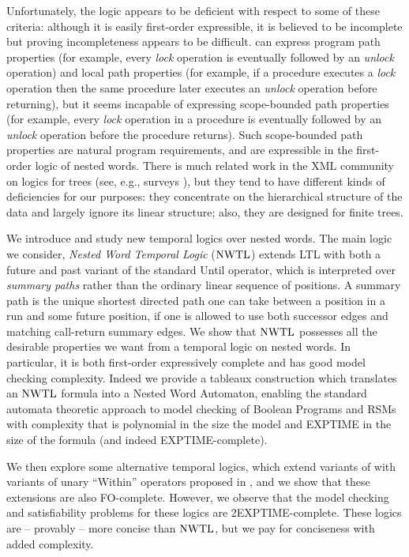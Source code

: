 \documentclass{LMCS}
\theoremstyle{plain}
\theoremstyle{definition}
\newcommand{\caret}{\text{CaRet}}
\newcounter{example}
\begin{document}
Unfortunately, the logic \caret{} appears to be deficient with respect
to some of these criteria: although it is easily first-order
expressible, it is believed to be incomplete but
proving incompleteness 
appears to be difficult.  
\caret{}  can express
program 
path properties (for example, every {\it lock\/} operation is
eventually followed by an {\em unlock\/} operation) and local path
properties (for example, if a procedure executes a {\em lock\/}
operation then the same procedure later executes an {\em unlock\/}
operation before returning), but it seems incapable of expressing
scope-bounded path properties (for example, every {\it lock\/}
operation in a procedure is eventually followed by an {\em unlock\/}
operation before the procedure returns).  Such scope-bounded path
properties are natural program requirements, and are expressible in
the first-order logic of nested words.  There is much related work in
the XML community on logics for trees (see, e.g., surveys
\cite{KSS03,Lib05,vianu-pods}), but they tend to have different kinds
of deficiencies for our purposes: they concentrate on the hierarchical
structure of the data and largely ignore its linear structure; also,
they are designed for finite trees.


We introduce and study new temporal logics over nested
words.  The main logic we consider, \emph{Nested Word Temporal Logic}
($\text{\rm NWTL}$) extends LTL with both a future and past variant of the
standard Until operator, which is interpreted over {\em summary paths}
rather than the ordinary linear sequence of positions.  A summary
path is the unique shortest directed path one can take
between a position in a run and some future position, if one is
allowed to use both successor edges and matching call-return
summary edges.  We show that $\text{\rm NWTL}$ possesses all the desirable
properties we want from a temporal logic on nested words.  In
particular, it is both first-order expressively complete and has good
model checking complexity.  Indeed we provide a tableaux construction
which translates an $\text{\rm NWTL}$ formula into a Nested Word Automaton,
enabling the standard automata theoretic approach to model checking of
Boolean Programs and RSMs with complexity that is polynomial in the
size the model and EXPTIME in the size of the formula (and indeed
EXPTIME-complete). 


We then explore some alternative temporal logics, which extend
variants of \caret{} with variants of unary ``Within'' operators
proposed in \cite{AEM04}, and we show that these extensions are also
FO-complete.  However, we observe that the model checking and
satisfiability problems for these logics are 2EXPTIME-complete.  
These logics are -- provably -- more concise than $\text{\rm NWTL}$, but we pay
for conciseness with added complexity.
\end{document}
